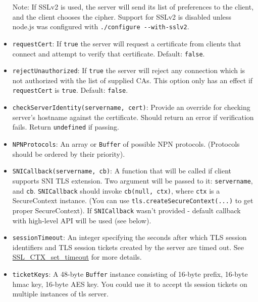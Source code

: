 \begin{itemize}
  Note: If SSLv2 is used, the server will send its list of preferences
  to the client, and the client chooses the cipher. Support for SSLv2 is
  disabled unless node.js was configured with
  \texttt{./configure\ -\/-with-sslv2}.
\item
  \texttt{requestCert}: If \texttt{true} the server will request a
  certificate from clients that connect and attempt to verify that
  certificate. Default: \texttt{false}.
\item
  \texttt{rejectUnauthorized}: If \texttt{true} the server will reject
  any connection which is not authorized with the list of supplied CAs.
  This option only has an effect if \texttt{requestCert} is
  \texttt{true}. Default: \texttt{false}.
\item
  \texttt{checkServerIdentity(servername,\ cert)}: Provide an override
  for checking server's hostname against the certificate. Should return
  an error if verification fails. Return \texttt{undefined} if passing.
\item
  \texttt{NPNProtocols}: An array or \texttt{Buffer} of possible NPN
  protocols. (Protocols should be ordered by their priority).
\item
  \texttt{SNICallback(servername,\ cb)}: A function that will be called
  if client supports SNI TLS extension. Two argument will be passed to
  it: \texttt{servername}, and \texttt{cb}. \texttt{SNICallback} should
  invoke \texttt{cb(null,\ ctx)}, where \texttt{ctx} is a SecureContext
  instance. (You can use \texttt{tls.createSecureContext(...)} to get
  proper SecureContext). If \texttt{SNICallback} wasn't provided -
  default callback with high-level API will be used (see below).
\item
  \texttt{sessionTimeout}: An integer specifying the seconds after which
  TLS session identifiers and TLS session tickets created by the server
  are timed out. See
  \href{http://www.openssl.org/docs/ssl/SSL_CTX_set_timeout.html}{SSL\_CTX\_set\_timeout}
  for more details.
\item
  \texttt{ticketKeys}: A 48-byte \texttt{Buffer} instance consisting of
  16-byte prefix, 16-byte hmac key, 16-byte AES key. You could use it to
  accept tls session tickets on multiple instances of tls server.


\end{itemize}
